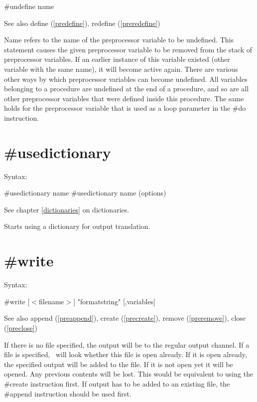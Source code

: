 \#undefine name
 
\noindent See also define (\ref{predefine}), redefine 
(\ref{preredefine})

\noindent {} Name refers to the name of the 
preprocessor variable to be undefined. This 
statement causes the given preprocessor variable to be removed from the 
stack of preprocessor variables. If an earlier instance of this variable 
existed (other variable with the same name), it will become active again. 
There are various other ways by which preprocessor variables can become 
undefined. All variables belonging to a procedure are undefined at the end 
of a procedure, and so are all other preprocessor variables that were 
defined inside this procedure. The same holds for the preprocessor variable 
that is used as a loop parameter in the \#do instruction.

 
\section{\#usedictionary}
\label{preusedictionary}

\noindent Syntax:

\#usedictionary name
\#usedictionary name (options)
 
\noindent See chapter \ref{dictionaries} on dictionaries.

\noindent Starts using a dictionary for output translation.


\section{\#write}
\label{prewrite}

\noindent Syntax:

\#write [$<$filename$>$] "formatstring" [,variables]
 
\noindent See also append (\ref{preappend}),
            create (\ref{precreate}), remove (\ref{preremove}),
            close (\ref{preclose})

\noindent If there is no file specified, the output will be 
to the regular output channel. If a file is 
specified, \FORM\ will look whether this file is open already. If it is open 
already, the specified output will be added to the file. If it is not open 
yet it will be opened. Any previous contents will be lost. This would be 
equivalent to using the \#create instruction first. If 
output has to be added to an existing file, the \#append 
instruction should be used first.

